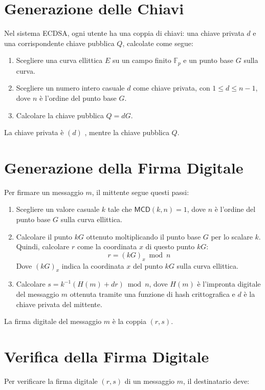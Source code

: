 \documentclass[a4paper,12pt]{report}
\begin{document}
\section{Generazione delle Chiavi}
Nel sistema ECDSA, ogni utente ha una coppia di chiavi: una chiave privata $d$ e una corrispondente chiave pubblica $Q$, calcolate come segue:

\begin{enumerate}
    \item Scegliere una curva ellittica $E$ su un campo finito $\mathbb{F}_p$ e un punto base $G$ sulla curva.
    \item Scegliere un numero intero casuale $d$ come chiave privata, con $1 \leq d \leq n-1$, dove $n$ è l'ordine del punto base $G$.
    \item Calcolare la chiave pubblica $Q = dG$.
\end{enumerate}

La chiave privata è $(d)$ , mentre la chiave pubblica $Q$.

\section{Generazione della Firma Digitale}

Per firmare un messaggio $m$, il mittente segue questi passi:

\begin{enumerate}
    \item Scegliere un valore casuale $k$ tale che $\mathsf{MCD}(k, n) = 1$, dove $n$ è l'ordine del punto base $G$ sulla curva ellittica.
    
    \item Calcolare il punto $kG$ ottenuto moltiplicando il punto base $G$ per lo scalare $k$. Quindi, calcolare $r$ come la coordinata $x$ di questo punto $kG$:
    \[r = (kG)_x \bmod n\]
    Dove $(kG)_x$ indica la coordinata $x$ del punto $kG$ sulla curva ellittica.
    
    \item Calcolare $s = k^{-1}(H(m) + dr) \bmod n$, dove $H(m)$ è l'impronta digitale del messaggio $m$ ottenuta tramite una funzione di hash crittografica e $d$ è la chiave privata del mittente.
\end{enumerate}

La firma digitale del messaggio $m$ è la coppia $(r, s)$.

\section{Verifica della Firma Digitale}
Per verificare la firma digitale $(r, s)$ di un messaggio $m$, il destinatario deve:
\end{document}
